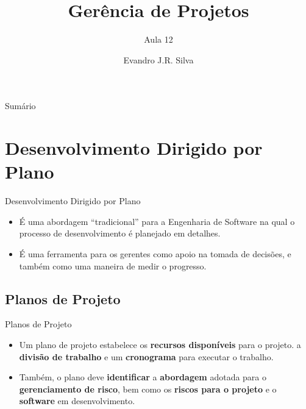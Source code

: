 \documentclass{beamer}
\title[GP 12]{Gerência de Projetos}
\subtitle{Aula 12}
\author[E.J.R. Silva]{Evandro J.R. Silva}
\date{}
\begin{document}
    
\begin{frame}
    \titlepage
\end{frame}

\begin{frame}{Sumário}
    \tableofcontents
\end{frame}

\section{Desenvolvimento Dirigido por Plano}


\begin{frame}{Desenvolvimento Dirigido por Plano}
    \begin{itemize}
        \justifying
        \item É uma abordagem ``tradicional'' para a Engenharia de Software na qual o processo de desenvolvimento é planejado em detalhes.
        \item É uma ferramenta para os gerentes como apoio na tomada de decisões, e também como uma maneira de medir o progresso.
    \end{itemize}
\end{frame}

\subsection{Planos de Projeto}

\begin{frame}{Planos de Projeto}
    \begin{itemize}
        \justifying
        \item Um plano de projeto estabelece os \textbf{recursos disponíveis} para o projeto. a \textbf{divisão de trabalho} e um \textbf{cronograma} para executar o trabalho.
        \item Também, o plano deve \textbf{identificar} a \textbf{abordagem} adotada para o \textbf{gerenciamento de risco}, bem como os \textbf{riscos para o projeto} e o \textbf{software} em desenvolvimento.
    \end{itemize}
\end{frame}
\end{document}
